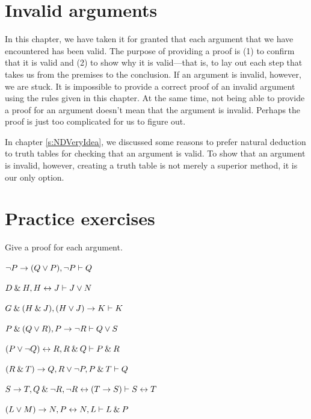 \section{Invalid arguments}

In this chapter, we have taken it for granted that each argument that we have encountered has been valid. The purpose of providing a proof is (1) to confirm that it is valid and (2) to show why it is valid---that is, to lay out each step that takes us from the premises to the conclusion. If an argument is invalid, however, we are stuck. It is impossible to provide a correct proof of an invalid argument using the rules given in this chapter. At the same time, not being able to provide a proof for an argument doesn't mean that the argument is invalid. Perhaps the proof is just too complicated for us to figure out. 

In chapter \ref{s:NDVeryIdea}, we discussed some reasons to prefer natural deduction to truth tables for checking that an argument is valid. To show that an argument is invalid, however, creating a truth table is not merely a superior method, it is our only option.



\section{Practice exercises}
\setcounter{ProbPart}{0}

\problempart
Give a proof for each argument.
\begin{earg}
\item ${\neg} P \rightarrow (Q \vee P), {\neg} P \vdash Q$\smallskip
\item $D \mathbin{\&} H, H \leftrightarrow J  \vdash J \vee N$\smallskip 
\item $G \mathbin{\&} (H \mathbin{\&} J), (H \vee J) \rightarrow K \vdash K$\smallskip
\item $P \mathbin{\&} (Q \vee R), P \rightarrow {\neg} R \vdash Q \vee S$\smallskip
\item $(P \vee {\neg} Q) \leftrightarrow R, R \mathbin{\&} Q \vdash P \mathbin{\&} R$\smallskip
\item $(R \mathbin{\&} T) \rightarrow Q, R \vee {\neg} P, P \mathbin{\&} T \vdash Q$\smallskip
\item $S \rightarrow T, Q \mathbin{\&} {\neg} R, {\neg} R \leftrightarrow (T \rightarrow S) \vdash S \leftrightarrow T $\smallskip
\item $(L \vee M) \rightarrow N, P \leftrightarrow N, L \vdash L \mathbin{\&} P$\smallskip
\end{earg}


